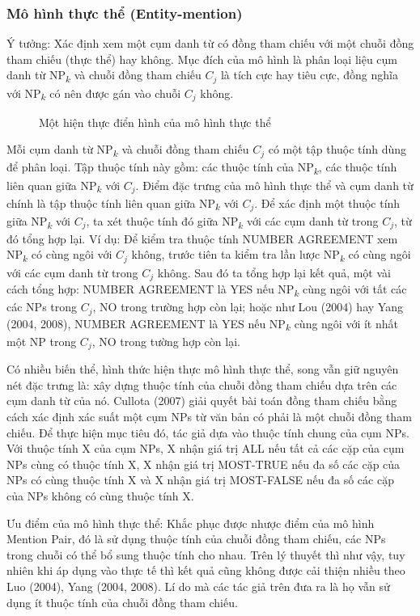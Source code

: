 \documentclass[12pt]{extarticle}
\begin{document}
			\subsubsection*{Mô hình thực thể (Entity-mention)}
				\par Ý tưởng: Xác định xem một cụm danh từ có đồng tham chiếu với một chuỗi đồng tham chiếu (thực thể) hay không. Mục đích của mô hình là phân loại liệu cụm danh từ NP\textsubscript{$k$} và chuỗi đồng tham chiếu $C_{j}$ là tích cực hay tiêu cực, đồng nghĩa với NP\textsubscript{$k$} có nên được gán vào chuỗi $C_{j}$ không.
				\begin{figure}[H]
					\centering
					
					\caption{Một hiện thực điển hình của mô hình thực thể}
				\end{figure}
				Mỗi cụm danh từ NP\textsubscript{$k$} và chuỗi đồng tham chiếu $C_{j}$ có một tập thuộc tính dùng để phân loại. Tập thuộc tính này gồm: các thuộc tính của NP\textsubscript{$k$}, các thuộc tính liên quan giữa NP\textsubscript{$k$} với $C_{j}$. Điểm đặc trưng của mô hình thực thể và cụm danh từ chính là tập thuộc tính liên quan giữa NP\textsubscript{$k$} với $C_{j}$. Để xác định một thuộc tính giữa NP\textsubscript{$k$} với $C_{j}$, ta xét thuộc tính đó giữa NP\textsubscript{$k$} với các cụm danh từ trong $C_{j}$, từ đó tổng hợp lại. Ví dụ: Để kiểm tra thuộc tính NUMBER AGREEMENT xem NP\textsubscript{$k$} có cùng ngôi với $C_{j}$ không, trước tiên ta kiểm tra lần lược NP\textsubscript{$k$} có cùng ngôi với các cụm danh từ trong $C_{j}$ không. Sau đó ta tổng hợp lại kết quả, một vài cách tổng hợp: NUMBER AGREEMENT là YES nếu NP\textsubscript{$k$} cùng ngôi với tất các các NPs trong $C_{j}$, NO trong trường hợp còn lại; hoặc như Lou (2004)\cite{lou04} hay Yang (2004, 2008)\cite{yang04}\cite{yang08}, NUMBER AGREEMENT là YES nếu NP\textsubscript{$k$} cùng ngôi với ít nhất một NP trong $C_{j}$, NO trong tường hợp còn lại.
				\par Có nhiều biến thể, hình thức hiện thực mô hình thực thể, song vẫn giữ nguyên nét đặc trưng là: xây dựng thuộc tính của chuỗi đồng tham chiếu dựa trên các cụm danh từ của nó. Cullota (2007)\cite{culotta07} giải quyết bài toán đồng tham chiếu bằng cách xác định xác suất một cụm NPs từ văn bản có phải là một chuỗi đồng tham chiếu. Để thực hiện mục tiêu đó, tác giả dựa vào thuộc tính chung của cụm NPs. Với thuộc tính X của cụm NPs, X nhận giá trị ALL nếu tất cả các cặp của cụm NPs cùng có thuộc tính X, X nhận giá trị MOST-TRUE nếu đa số các cặp của NPs có cùng thuộc tính X và X nhận giá trị MOST-FALSE nếu đa số các cặp của NPs không có cùng thuộc tính X. 
				\par Ưu điểm của mô hình thực thể: Khắc phục được nhược điểm của mô hình Mention Pair, đó là sử dụng thuộc tính của chuỗi đồng tham chiếu, các NPs trong chuỗi có thể bổ sung thuộc tính cho nhau. Trên lý thuyết thì như vậy, tuy nhiên khi áp dụng vào thực tế thì kết quả cũng không được cải thiện nhiều theo Luo (2004)\cite{lou04}, Yang (2004, 2008)\cite{yang04}\cite{yang08}. Lí do mà các tác giả trên đưa ra là họ vẫn sử dụng ít thuộc tính của chuỗi đồng tham chiếu.
\end{document}
